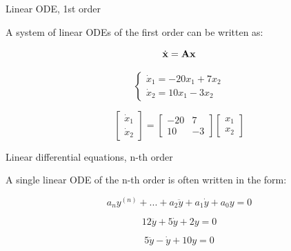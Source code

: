 \documentclass{beamer}
\begin{document}
\begin{frame}{Linear ODE, 1st order}
\begin{flushleft}

A system of linear ODEs of the first order can be written as:

\begin{equation}
    \dot{\mathbf{x}} = \mathbf{A} \mathbf{x}
\end{equation}

\begin{example}
\begin{equation}
\begin{cases}
    \dot{x}_1 = -20 x_1 + 7 x_2 \\
    \dot{x}_2 = 10 x_1 - 3 x_2
\end{cases}
\end{equation}
\end{example}

\begin{example}
\begin{equation}
\begin{bmatrix}
\dot{x}_1 \\
\dot{x}_2
\end{bmatrix} 
= 
\begin{bmatrix}
-20   & 7  \\
 10 & -3
\end{bmatrix}
\begin{bmatrix}
x_1 \\
x_2
\end{bmatrix} 
\end{equation}
\end{example}

\end{flushleft}
\end{frame}




\begin{frame}{Linear differential equations, n-th order}
\begin{flushleft}

A single linear ODE of the n-th order is often written in the form:

\begin{equation}
    a_n y^{(n)} + 
    ... +
    a_2 \ddot{y} + a_1 \dot{y} + 
    a_0 y = 0
\end{equation}

\begin{example}
\begin{equation}
12 \dddot{y}  + 5 \dot{y} + 
    2 y = 0
\end{equation}
\end{example}

\begin{example}
\begin{equation}
    5 \ddot{y} - \dot{y} + 
    10 y = 0
\end{equation}
\end{example}

\end{flushleft}
\end{frame}
\end{document}
